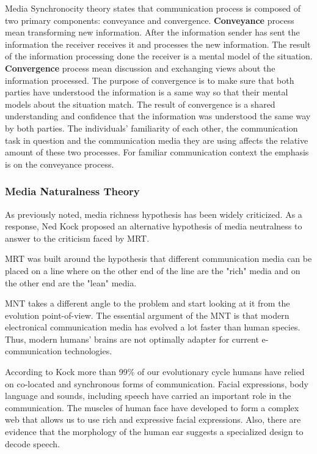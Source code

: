 \documentclass[english,12pt,a4paper,pdftex]{article}
\begin{document}
Media Synchronocity theory states that communication process is composed of two primary components: conveyance and convergence. \textbf{Conveyance} process mean transforming new information. After the information sender has sent the information the receiver receives it and processes the new information. The result of the information processing done the receiver is a mental model of the situation. \textbf{Convergence} process mean discussion and exchanging views about the information processed. The purpose of convergence is to make sure that both parties have understood the information is a same way so that their mental models about the situation match. The result of convergence is a shared understanding and confidence that the information was understood the same way by both parties. The individuals' familiarity of each other, the communication task in question and the communication media they are using affects the relative amount of these two processes. For familiar communication context the emphasis is on the conveyance process. \citep{dennis2008}

\subsubsection{Media Naturalness Theory}

As previously noted, media richness hypothesis has been widely criticized. As a response, Ned Kock proposed an alternative hypothesis of media neutralness to answer to the criticism faced by \ac{MRT}.

\ac{MRT} was built around the hypothesis that different communication media can be placed on a line where on the other end of the line are the "rich" media and on the other end are the "lean" media. \citep{daft1986}

\Ac{MNT} takes a different angle to the problem and start looking at it from the evolution point-of-view. The essential argument of the \ac{MNT} is that modern electronical communication media has evolved a lot faster than human species. Thus, modern humans' brains are not optimally adapter for current e-communication technologies. \citep{kock2005}

According to Kock more than 99\% of our evolutionary cycle humans have relied on co-located and synchronous forms of communication. Facial expressions, body language and sounds, including speech have carried an important role in the communication. The muscles of human face have developed to form a complex web that allows us to use rich and expressive facial expressions. Also, there are evidence that the morphology of the human ear suggests a specialized design to decode speech. \citep{kock2005}
\end{document}
